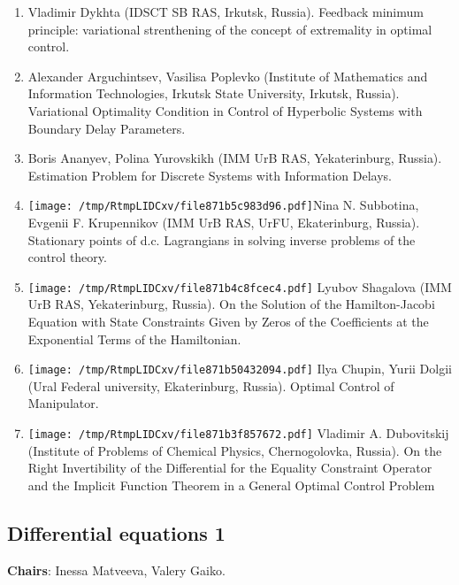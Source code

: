 \documentclass[
]{article}
\providecommand{\tightlist}{%
  \setlength{\itemsep}{0pt}\setlength{\parskip}{0pt}}
\begin{document}
\begin{enumerate}
\def\labelenumi{\arabic{enumi}.}
\tightlist
\item
  Vladimir Dykhta (IDSCT SB RAS, Irkutsk, Russia). Feedback minimum
  principle: variational strenthening of the concept of extremality in
  optimal control.
\item
  Alexander Arguchintsev, Vasilisa Poplevko (Institute of Mathematics
  and Information Technologies, Irkutsk State University, Irkutsk,
  Russia). Variational Optimality Condition in Control of Hyperbolic
  Systems with Boundary Delay Parameters.
\item
  Boris Ananyev, Polina Yurovskikh (IMM UrB RAS, Yekaterinburg, Russia).
  Estimation Problem for Discrete Systems with Information Delays.
\item
  \protect\texttt{[image: /tmp/RtmpLIDCxv/file871b5c983d96.pdf]}Nina
  N. Subbotina, Evgenii F. Krupennikov (IMM UrB RAS, UrFU, Ekaterinburg,
  Russia). Stationary points of d.c. Lagrangians in solving inverse
  problems of the control theory.
\item
  \protect\texttt{[image: /tmp/RtmpLIDCxv/file871b4c8fcec4.pdf]}
  Lyubov Shagalova (IMM UrB RAS, Yekaterinburg, Russia). On the Solution
  of the Hamilton-Jacobi Equation with State Constraints Given by Zeros
  of the Coefficients at the Exponential Terms of the Hamiltonian.
\item
  \protect\texttt{[image: /tmp/RtmpLIDCxv/file871b50432094.pdf]}
  Ilya Chupin, Yurii Dolgii (Ural Federal university, Ekaterinburg,
  Russia). Optimal Control of Manipulator.
\item
  \protect\texttt{[image: /tmp/RtmpLIDCxv/file871b3f857672.pdf]}
  Vladimir A. Dubovitskij (Institute of Problems of Chemical Physics,
  Chernogolovka, Russia). On the Right Invertibility of the Differential
  for the Equality Constraint Operator and the Implicit Function Theorem
  in a General Optimal Control Problem
\end{enumerate}

\hypertarget{de1}{%
\subsection{Differential equations 1}\label{de1}}

\textbf{Chairs}: Inessa Matveeva, Valery Gaiko.
\end{document}
